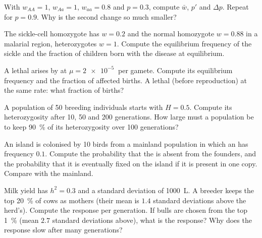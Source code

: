 \begin{exercise}[$\star\star$]\label{exo:b2:population-genetics:6}
With $w_{AA} = 1$, $w_{Aa} = 1$, $w_{aa} = 0.8$ and $p = 0.3$, compute
$\bar w$, $p'$ and $\Delta p$. Repeat for $p = 0.9$. Why is the
second change so much smaller?
\end{exercise}

\begin{exercise}[$\star\star$]\label{exo:b2:population-genetics:7}
The sickle-cell homozygote has $w = 0.2$ and the normal homozygote
$w = 0.88$ in a malarial region, heterozygotes $w = 1$. Compute the
equilibrium frequency of the sickle  and the fraction of
children born with the disease at equilibrium.
\end{exercise}

\begin{exercise}[$\star\star$]\label{exo:b2:population-genetics:8}
A  lethal arises by  at $\mu = \qty{2e-5}{}$ per
gamete. Compute its equilibrium frequency and the fraction of
affected births. A  lethal (before reproduction) at the same
rate: what fraction of births?
\end{exercise}

\begin{exercise}[$\star\star$]\label{exo:b2:population-genetics:9}
A population of 50 breeding individuals starts with $H = 0.5$.
Compute its heterozygosity after 10, 50 and 200 generations. How
large must a population be to keep \qty{90}{\%} of its
heterozygosity over 100 generations?
\end{exercise}

\begin{exercise}[$\star\star\star$]\label{exo:b2:population-genetics:10}
An island is colonised by 10 birds from a mainland population in
which an  has frequency $0.1$. Compute the probability that
the  is absent from the founders, and the probability that it
is eventually fixed on the island if it is present in one copy.
Compare with the mainland.
\end{exercise}

\begin{exercise}[$\star\star\star$]\label{exo:b2:population-genetics:11}
Milk yield has $h^{2} = 0.3$ and a standard deviation of
\qty{1000}{L}. A breeder keeps the top \qty{20}{\%} of cows as
mothers (their mean is $1.4$ standard deviations above the herd's).
Compute the response per generation. If bulls are chosen from the
top \qty{1}{\%} (mean $2.7$ standard deviations above), what is the
response? Why does the response slow after many generations?
\end{exercise}

